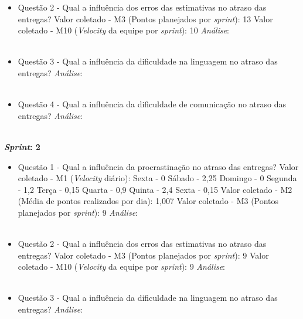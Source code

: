 \begin{apendicesenv}
\begin{itemize}
	  \item Questão 2 - Qual a influência dos erros das estimativas no atraso das entregas? 
	    \subitem Valor coletado - M3 (Pontos planejados por \textit{sprint}): 13
	    \subitem Valor coletado - M10 (\textit{Velocity} da equipe por \textit{sprint}): 10
	    \subitem \textit{Análise}:
	    \\
	    \\
	    
	  \item Questão 3 - Qual a influência da dificuldade na linguagem no atraso das entregas?
	    \subitem \textit{Análise}:
	  \\
	  \\
	  
	  \item Questão 4 - Qual a influência da dificuldade de comunicação no atraso das entregas?
	    \subitem \textit{Análise}:
	  \\
	  \\
	  
	\end{itemize}
	    \vfill
	    \pagebreak
	\textbf{\textit{Sprint}: 2}
	
	\begin{itemize}
	  
	  \item Questão 1 - Qual a influência da procrastinação no atraso das entregas?
	    \subitem Valor coletado - M1 (\textit{Velocity} diário):
	      \subsubitem Sexta - 0
	      \subsubitem Sábado - 2,25
	      \subsubitem Domingo - 0
	      \subsubitem Segunda - 1,2
	      \subsubitem Terça - 0,15
	      \subsubitem Quarta - 0,9
	      \subsubitem Quinta - 2,4
	      \subsubitem Sexta - 0,15
	    \subitem Valor coletado - M2 (Média de pontos realizados por dia): 1,007
	    \subitem Valor coletado - M3 (Pontos planejados por \textit{sprint}): 9
	    \subitem \textit{Análise}:
	    \\
	    \\

	  \item Questão 2 - Qual a influência dos erros das estimativas no atraso das entregas? 
	    \subitem Valor coletado - M3 (Pontos planejados por \textit{sprint}): 9
	    \subitem Valor coletado - M10 (\textit{Velocity} da equipe por \textit{sprint}): 9
	    \subitem \textit{Análise}:
	    \\
	    \\
	    
	  \item Questão 3 - Qual a influência da dificuldade na linguagem no atraso das entregas?
	    \subitem \textit{Análise}:
	  \\
	  \\
	  

\end{itemize}
\end{apendicesenv}
